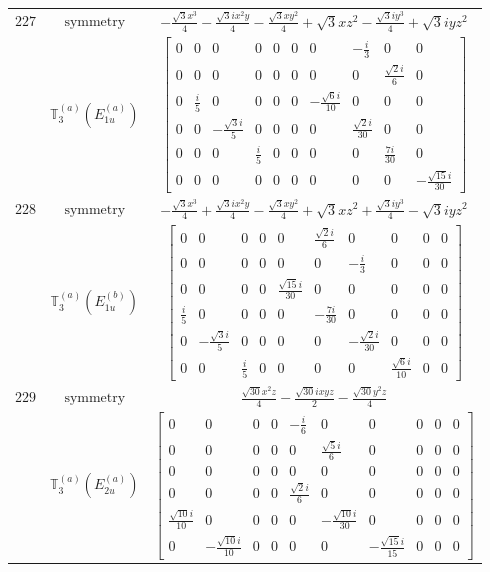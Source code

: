 \documentclass[fleqn,8pt,landscape]{jsarticle}
\begin{document}
\begin{longtable}{ccc}
$ 227 $ & $ \text{symmetry} $ & $ - \frac{\sqrt{3} x^{3}}{4} - \frac{\sqrt{3} i x^{2} y}{4} - \frac{\sqrt{3} x y^{2}}{4} + \sqrt{3} x z^{2} - \frac{\sqrt{3} i y^{3}}{4} + \sqrt{3} i y z^{2} $ \\
$  $ & $ \mathbb{T}_{3}^{(a)}(E_{1u}^{(a)}) $ & $ \begin{bmatrix} 0 & 0 & 0 & 0 & 0 & 0 & 0 & - \frac{i}{3} & 0 & 0 \\ 0 & 0 & 0 & 0 & 0 & 0 & 0 & 0 & \frac{\sqrt{2} i}{6} & 0 \\ 0 & \frac{i}{5} & 0 & 0 & 0 & 0 & - \frac{\sqrt{6} i}{10} & 0 & 0 & 0 \\ 0 & 0 & - \frac{\sqrt{3} i}{5} & 0 & 0 & 0 & 0 & \frac{\sqrt{2} i}{30} & 0 & 0 \\ 0 & 0 & 0 & \frac{i}{5} & 0 & 0 & 0 & 0 & \frac{7 i}{30} & 0 \\ 0 & 0 & 0 & 0 & 0 & 0 & 0 & 0 & 0 & - \frac{\sqrt{15} i}{30} \end{bmatrix} $ \\ \hline
$ 228 $ & $ \text{symmetry} $ & $ - \frac{\sqrt{3} x^{3}}{4} + \frac{\sqrt{3} i x^{2} y}{4} - \frac{\sqrt{3} x y^{2}}{4} + \sqrt{3} x z^{2} + \frac{\sqrt{3} i y^{3}}{4} - \sqrt{3} i y z^{2} $ \\
$  $ & $ \mathbb{T}_{3}^{(a)}(E_{1u}^{(b)}) $ & $ \begin{bmatrix} 0 & 0 & 0 & 0 & 0 & \frac{\sqrt{2} i}{6} & 0 & 0 & 0 & 0 \\ 0 & 0 & 0 & 0 & 0 & 0 & - \frac{i}{3} & 0 & 0 & 0 \\ 0 & 0 & 0 & 0 & \frac{\sqrt{15} i}{30} & 0 & 0 & 0 & 0 & 0 \\ \frac{i}{5} & 0 & 0 & 0 & 0 & - \frac{7 i}{30} & 0 & 0 & 0 & 0 \\ 0 & - \frac{\sqrt{3} i}{5} & 0 & 0 & 0 & 0 & - \frac{\sqrt{2} i}{30} & 0 & 0 & 0 \\ 0 & 0 & \frac{i}{5} & 0 & 0 & 0 & 0 & \frac{\sqrt{6} i}{10} & 0 & 0 \end{bmatrix} $ \\ \hline
$ 229 $ & $ \text{symmetry} $ & $ \frac{\sqrt{30} x^{2} z}{4} - \frac{\sqrt{30} i x y z}{2} - \frac{\sqrt{30} y^{2} z}{4} $ \\
$  $ & $ \mathbb{T}_{3}^{(a)}(E_{2u}^{(a)}) $ & $ \begin{bmatrix} 0 & 0 & 0 & 0 & - \frac{i}{6} & 0 & 0 & 0 & 0 & 0 \\ 0 & 0 & 0 & 0 & 0 & \frac{\sqrt{5} i}{6} & 0 & 0 & 0 & 0 \\ 0 & 0 & 0 & 0 & 0 & 0 & 0 & 0 & 0 & 0 \\ 0 & 0 & 0 & 0 & \frac{\sqrt{2} i}{6} & 0 & 0 & 0 & 0 & 0 \\ \frac{\sqrt{10} i}{10} & 0 & 0 & 0 & 0 & - \frac{\sqrt{10} i}{30} & 0 & 0 & 0 & 0 \\ 0 & - \frac{\sqrt{10} i}{10} & 0 & 0 & 0 & 0 & - \frac{\sqrt{15} i}{15} & 0 & 0 & 0 \end{bmatrix} $ \\ \hline

\end{longtable}
\end{document}
